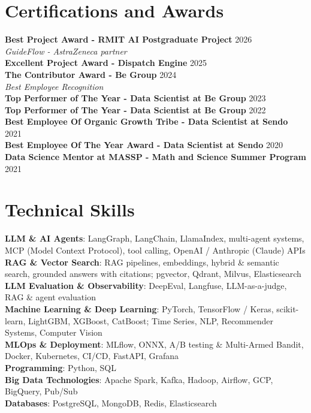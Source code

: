 \documentclass[10pt, letterpaper]{article}
\begin{document}
\section{Certifications and Awards}
\small
\textbf{Best Project Award - RMIT AI Postgraduate Project} \hfill 2026 \\
\textit{GuideFlow - AstraZeneca partner} \\

\textbf{Excellent Project Award - Dispatch Engine} \hfill 2025 \\
\textbf{The Contributor Award - Be Group} \hfill 2024 \\
\textit{Best Employee Recognition} \\

\textbf{Top Performer of The Year - Data Scientist at Be Group} \hfill 2023 \\

\textbf{Top Performer of The Year - Data Scientist at Be Group} \hfill 2022 \\

\textbf{Best Employee Of Organic Growth Tribe - Data Scientist at Sendo} \hfill 2021 \\

\textbf{Best Employee Of The Year Award - Data Scientist at Sendo} \hfill 2020 \\

\textbf{Data Science Mentor at MASSP - Math and Science Summer Program} \hfill 2021 \\

\normalsize

\section{Technical Skills}
\textbf{LLM \& AI Agents}: LangGraph, LangChain, LlamaIndex, multi-agent systems, MCP (Model Context Protocol), tool calling, OpenAI / Anthropic (Claude) APIs \\
\textbf{RAG \& Vector Search}: RAG pipelines, embeddings, hybrid \& semantic search, grounded answers with citations; pgvector, Qdrant, Milvus, Elasticsearch \\
\textbf{LLM Evaluation \& Observability}: DeepEval, Langfuse, LLM-as-a-judge, RAG \& agent evaluation \\
\textbf{Machine Learning \& Deep Learning}: PyTorch, TensorFlow / Keras, scikit-learn, LightGBM, XGBoost, CatBoost; Time Series, NLP, Recommender Systems, Computer Vision \\
\textbf{MLOps \& Deployment}: MLflow, ONNX, A/B testing \& Multi-Armed Bandit, Docker, Kubernetes, CI/CD, FastAPI, Grafana \\
\textbf{Programming}: Python, SQL \\
\textbf{Big Data Technologies}: Apache Spark, Kafka, Hadoop, Airflow, GCP, BigQuery, Pub/Sub \\
\textbf{Databases}: PostgreSQL, MongoDB, Redis, Elasticsearch
\end{document}
